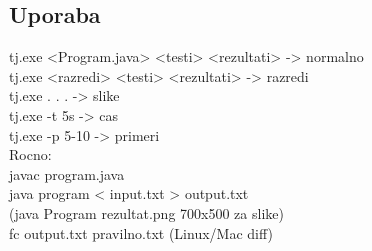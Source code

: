\documentclass[a4paper,oneside,12pt]{article}
\theoremstyle{definition}
\begin{document}
	\subsection{Uporaba}
		tj.exe <Program.java> <testi> <rezultati> -> normalno\\
		tj.exe <razredi> <testi> <rezultati> -> razredi\\
		tj.exe . . . -> slike\\
		tj.exe -t 5s -> cas\\
		tj.exe -p 5-10 -> primeri\\
		Rocno:\\
		javac program.java\\
		java program < input.txt > output.txt\\
		(java Program rezultat.png 700x500 za slike)\\
		fc output.txt pravilno.txt (Linux/Mac diff)\\
\end{document}
